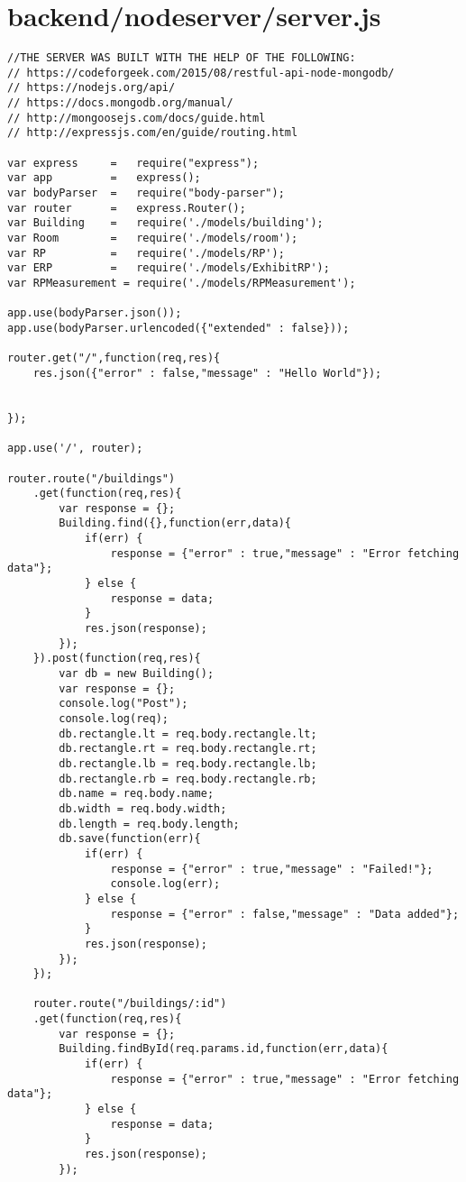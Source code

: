 \section{backend/nodeserver/server.js}
\begin{lstlisting}//THE SERVER WAS BUILT WITH THE HELP OF THE FOLLOWING:
// https://codeforgeek.com/2015/08/restful-api-node-mongodb/
// https://nodejs.org/api/
// https://docs.mongodb.org/manual/
// http://mongoosejs.com/docs/guide.html
// http://expressjs.com/en/guide/routing.html

var express     =   require("express");
var app         =   express();
var bodyParser  =   require("body-parser");
var router      =   express.Router();
var Building    =   require('./models/building');
var Room        =   require('./models/room');
var RP          =   require('./models/RP');
var ERP         =   require('./models/ExhibitRP');
var RPMeasurement = require('./models/RPMeasurement');

app.use(bodyParser.json());
app.use(bodyParser.urlencoded({"extended" : false}));

router.get("/",function(req,res){
    res.json({"error" : false,"message" : "Hello World"});


});

app.use('/', router);

router.route("/buildings")
    .get(function(req,res){
        var response = {};
        Building.find({},function(err,data){
            if(err) {
                response = {"error" : true,"message" : "Error fetching data"};
            } else {
                response = data;
            }
            res.json(response);
        });
    }).post(function(req,res){
        var db = new Building();
        var response = {};
        console.log("Post");
        console.log(req);
        db.rectangle.lt = req.body.rectangle.lt;
        db.rectangle.rt = req.body.rectangle.rt;
        db.rectangle.lb = req.body.rectangle.lb;
        db.rectangle.rb = req.body.rectangle.rb;
        db.name = req.body.name;
        db.width = req.body.width;
        db.length = req.body.length; 
        db.save(function(err){
            if(err) {
                response = {"error" : true,"message" : "Failed!"};
                console.log(err);
            } else {
                response = {"error" : false,"message" : "Data added"};
            }
            res.json(response);
        });
    });

    router.route("/buildings/:id")
    .get(function(req,res){
        var response = {};
        Building.findById(req.params.id,function(err,data){
            if(err) {
                response = {"error" : true,"message" : "Error fetching data"};
            } else {
                response = data;
            }
            res.json(response);
        });
        

\end{lstlisting}
